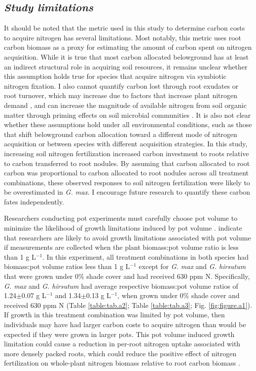 \subsection{\textit{Study limitations}}
\noindent It should be noted that the metric used in this study to determine carbon costs to acquire nitrogen has several limitations. Most notably, this metric uses root carbon biomass as a proxy for estimating the amount of carbon spent on nitrogen acquisition. While it is true that most carbon allocated belowground has at least an indirect structural role in acquiring soil resources, it remains unclear whether this assumption holds true for species that acquire nitrogen via symbiotic nitrogen fixation. I also cannot quantify carbon lost through root exudates or root turnover, which may increase due to factors that increase plant nitrogen demand , and can increase the magnitude of available nitrogen from soil organic matter through priming effects on soil microbial communities . It is also not clear whether these assumptions hold under all environmental conditions, such as those that shift belowground carbon allocation toward a different mode of nitrogen acquisition  or between species with different acquisition strategies. In this study, increasing soil nitrogen fertilization increased carbon investment to roots relative to carbon transferred to root nodules. By assuming that carbon allocated to root carbon was proportional to carbon allocated to root nodules across all treatment combinations, these observed responses to soil nitrogen fertilization were likely to be overestimated in \textit{G. max}. I encourage future research to quantify these carbon fates independently.

Researchers conducting pot experiments must carefully choose pot volume to minimize the likelihood of growth limitations induced by pot volume .  indicate that researchers are likely to avoid growth limitations associated with pot volume if measurements are collected when the plant biomass:pot volume ratio is less than 1 g L$^{-1}$. In this experiment, all treatment combinations in both species had biomass:pot volume ratios less than 1 g L$^{-1}$ except for \textit{G. max} and \textit{G. hirsutum} that were grown under 0\% shade cover and had received 630 ppm N. Specifically, \textit{G. max} and \textit{G. hirsutum} had average respective biomass:pot volume ratios of 1.24$\pm$0.07 g L$^{-1}$ and 1.34$\pm$0.13 g L$^{-1}$, when grown under 0\% shade cover and received 630 ppm N (Table \ref{table:tab.a2}; Table \ref{table:tab.a3}; Fig. \ref{fig:figure.a1}). If growth in this treatment combination was limited by pot volume, then individuals may have had larger carbon costs to acquire nitrogen than would be expected if they were grown in larger pots. This pot volume induced growth limitation could cause a reduction in per-root nitrogen uptake associated with more densely packed roots, which could reduce the positive effect of nitrogen fertilization on whole-plant nitrogen biomass relative to root carbon biomass .

